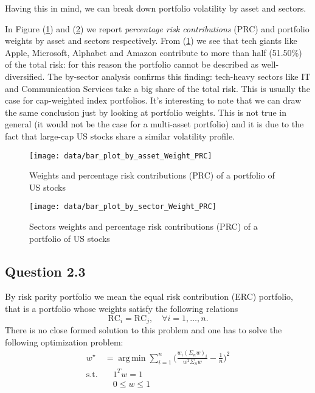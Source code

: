 \documentclass[12pt, a4paper]{article}
\DeclareMathOperator*{\argmin}{arg\,min}
\theoremstyle{problemstyle}
\begin{document}
Having this in mind, we can break down portfolio volatility by asset and sectors. 

In Figure (\ref{fig:histo_by_asset}) and (\ref{fig:histo_by_sector}) we report \textit{percentage risk contributions} (PRC) and portfolio weights by asset and sectors respectively. From (\ref{fig:histo_by_asset}) we see that tech giants like Apple, Microsoft, Alphabet and Amazon contribute to more than half (51.50\%) of the total risk: for this reason the portfolio cannot be described as well-diversified. The by-sector analysis confirms this finding: tech-heavy sectors like IT and Communication Services take a big share of the total risk. This is usually the case for cap-weighted index portfolios. It's interesting to note that we can draw the same conclusion just by looking at portfolio weights. This is not true in general (it would not be the case for a multi-asset portfolio) and it is due to the fact that large-cap US stocks share a similar volatility profile.

\begin{figure}[H]
	\centering
	\texttt{[image: data/bar\_plot\_by\_asset\_Weight\_PRC]}
	\caption{Weights and percentage risk contributions (PRC) of a portfolio of US stocks}
	\label{fig:histo_by_asset}
\end{figure}
\begin{figure}[H]
 	\centering
 	\texttt{[image: data/bar\_plot\_by\_sector\_Weight\_PRC]}
 	\caption{Sectors weights and percentage risk contributions (PRC) of a portfolio of US stocks}
 	\label{fig:histo_by_sector}
 \end{figure}

\centering


\centering


\subsection{Question 2.3}
By risk parity portfolio we mean the equal risk contribution (ERC) portfolio, that is a portfolio whose weights satisfy the following relations
\begin{equation}
\text{RC}_i = \text{RC}_j, \quad \forall i=1, \ldots, n.
\end{equation}
There is no close formed solution to this problem and one has to solve the following optimization problem:
\begin{align}
w^{\star} & =  \argmin\sum_{i=1}^n\Bigg(\frac{w_i(\Sigma_n w)_i}{w^T \Sigma_n w} - \frac{1}{n}\Bigg)^2\\
\text{s.t.} & \quad 1^T w = 1 \\
& \quad 0 \leq w \leq 1
\end{align}
\end{document}
